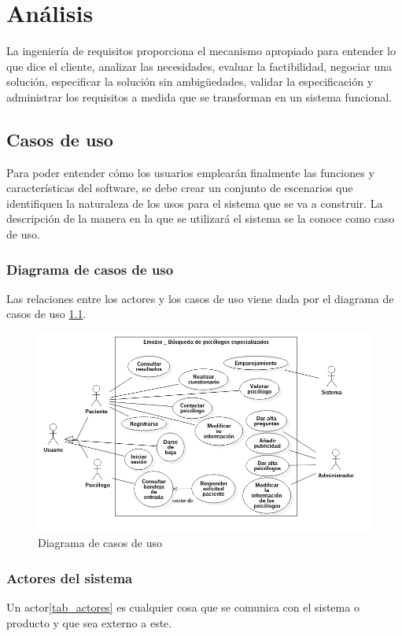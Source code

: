 \chapter{Análisis}

La ingeniería de requisitos proporciona el mecanismo apropiado para entender lo que dice el cliente, analizar las necesidades, evaluar la factibilidad, negociar una solución, especificar la solución sin ambigüedades, validar la especificación y administrar los requisitos a medida que se transforman en un sistema funcional\cite{pressman}.

\section{Casos de uso}
Para poder entender cómo los usuarios emplearán finalmente las funciones y características del software, se debe crear un conjunto de escenarios que identifiquen la naturaleza de los usos para el sistema que se va a construir. La descripción de la manera en la que se utilizará el sistema se la conoce como caso de uso.

\subsection{Diagrama de casos de uso}
Las relaciones entre los actores y los casos de uso viene dada por el diagrama de casos de uso \ref{fig:diag_casos_uso}.

\begin{figure}[htbp] 
    \centering
    \includegraphics[width=1\textwidth]{figuras/diag_casos_uso.png}
    \caption{Diagrama de casos de uso}
    \label{fig:diag_casos_uso}
\end{figure}	

\subsection{Actores del sistema}
Un actor\ref{tab_actores} es cualquier cosa que se comunica con el sistema o producto y que sea externo a este. 

